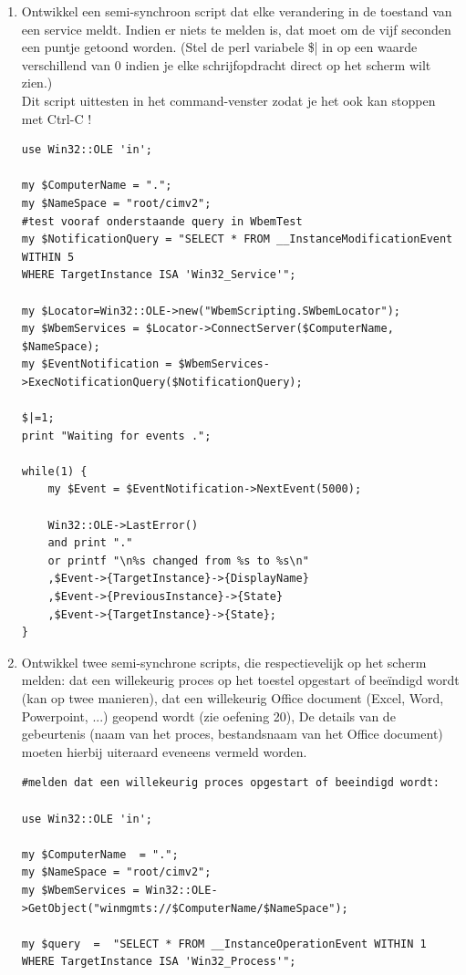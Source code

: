\documentclass[11pt,a4paper]{report}
\begin{document}
\begin{enumerate}[resume]
	\item Ontwikkel een semi-synchroon script dat elke verandering in de toestand van een service meldt. Indien er niets te melden is, dat moet om de vijf seconden een puntje getoond worden.
	(Stel de perl variabele \$| in op een waarde verschillend van 0 indien je elke schrijfopdracht direct op het scherm wilt zien.)
	\\Dit script uittesten in het command-venster zodat je het ook kan stoppen met Ctrl-C !
	\begin{lstlisting}
use Win32::OLE 'in';

my $ComputerName = ".";
my $NameSpace = "root/cimv2";
#test vooraf onderstaande query in WbemTest
my $NotificationQuery = "SELECT * FROM __InstanceModificationEvent WITHIN 5 
WHERE TargetInstance ISA 'Win32_Service'";

my $Locator=Win32::OLE->new("WbemScripting.SWbemLocator");
my $WbemServices = $Locator->ConnectServer($ComputerName, $NameSpace);
my $EventNotification = $WbemServices->ExecNotificationQuery($NotificationQuery);

$|=1; 
print "Waiting for events .";

while(1) {
	my $Event = $EventNotification->NextEvent(5000);
	
	Win32::OLE->LastError() 
	and print "." 
	or printf "\n%s changed from %s to %s\n"
	,$Event->{TargetInstance}->{DisplayName}
	,$Event->{PreviousInstance}->{State}
	,$Event->{TargetInstance}->{State};
}
	\end{lstlisting}
	\item Ontwikkel twee semi-synchrone scripts, die respectievelijk op het scherm melden:
	dat een willekeurig proces op het toestel opgestart of beeïndigd wordt (kan op twee manieren),
	dat een willekeurig Office document (Excel, Word, Powerpoint, ...) geopend wordt (zie oefening 20),
	De details van de gebeurtenis (naam van het proces, bestandsnaam van het Office document) moeten hierbij uiteraard eveneens vermeld worden.
	\begin{lstlisting}
#melden dat een willekeurig proces opgestart of beeindigd wordt:

use Win32::OLE 'in';

my $ComputerName  = ".";
my $NameSpace = "root/cimv2";
my $WbemServices = Win32::OLE->GetObject("winmgmts://$ComputerName/$NameSpace");

my $query  =  "SELECT * FROM __InstanceOperationEvent WITHIN 1
WHERE TargetInstance ISA 'Win32_Process'";


\end{lstlisting}
\end{enumerate}
\end{document}
